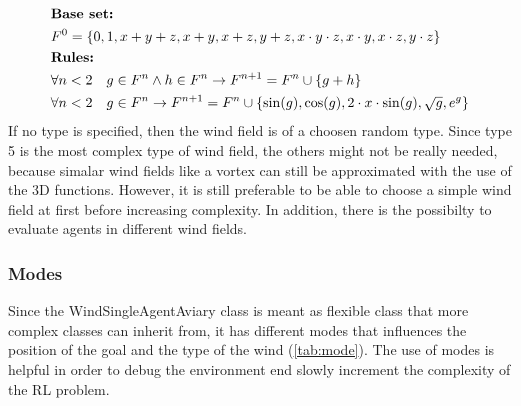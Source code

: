 \newpage
\begin{align}
	&\textbf{Base set:} \notag \\
	&F^0 = \{0, 1, x + y + z, x + y, x + z, y + z, 
	x \cdot y \cdot z, x \cdot y, x \cdot z, y \cdot z\} \label{eq:base}\\
	&\textbf{Rules:} \notag \\
	&\forall n < 2 \quad g \in F^n \land h \in F^n \rightarrow F^{n+1} = F^n \cup \{ 
	 g + h\} \label{eq:rule0}\\
	&\forall n < 2 \quad g \in F^n \rightarrow F^{n+1} = F^n \cup \{ \sin(g), \cos(g), 2 \cdot x \cdot \sin(g), \sqrt{g}, e^g\} \label{eq:rule1}
\end{align}
\newline
If no type is specified, then the wind field is of a choosen random type.
Since type 5 is the most complex type of wind field, the others might not be really needed, because simalar wind fields like a vortex can still be approximated with the use of the 3D functions. However, it is still preferable to be able to choose a simple wind field at first before increasing complexity. In addition, there is the possibilty to evaluate agents in different wind fields.

\subsubsection{Modes}\label{sec:modes}
Since the WindSingleAgentAviary class is meant as flexible class that more complex classes can inherit from, it has different modes that influences the position of the goal and the type of the wind (\cref{tab:mode}).
The use of modes is helpful in order to debug the environment end slowly increment the complexity of the RL problem.


